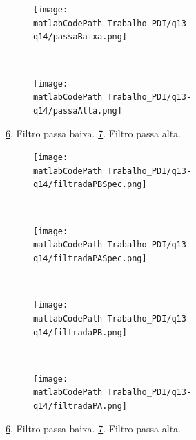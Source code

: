 \documentclass[
	article,			%
	11pt,				%
	oneside,			%
	a4paper,			%
	english,			%
	brazil,				%
	sumario=tradicional
	]{abntex2}
\newcommand{\matlabCodePath}{/home/clifte/git/Mestrado/Matlab/}
\begin{document}
\begin{figure}
		\centering
        \begin{subfigure}[b]{0.3\textwidth}
                \texttt{[image: \\matlabCodePath Trabalho\_PDI/q13-q14/passaBaixa.png]}
                \caption{}
                \label{fig:passaBaixa}
        \end{subfigure}%
        ~ %
        \begin{subfigure}[b]{0.3\textwidth}
                \texttt{[image: \\matlabCodePath Trabalho\_PDI/q13-q14/passaAlta.png]}
                \caption{}
                \label{fig:passaAlta}
        \end{subfigure}
       
        \caption{ 
        \ref{fig:passaBaixa}. Filtro passa baixa.
        \ref{fig:passaAlta}. Filtro passa alta. 
        }
	\label{fig:filtrosFrequencia}
\end{figure}

\begin{figure}
		\centering
        \begin{subfigure}[b]{0.3\textwidth} 
                \texttt{[image: \\matlabCodePath Trabalho\_PDI/q13-q14/filtradaPBSpec.png]}
                \caption{}
                \label{fig:passaBaixa}
        \end{subfigure}%
        ~ %
        \begin{subfigure}[b]{0.3\textwidth}
                \texttt{[image: \\matlabCodePath Trabalho\_PDI/q13-q14/filtradaPASpec.png]}
                \caption{}
                \label{fig:passaAlta}
        \end{subfigure}
 		~      
		\centering
        \begin{subfigure}[b]{0.3\textwidth}
                \texttt{[image: \\matlabCodePath Trabalho\_PDI/q13-q14/filtradaPB.png]}
                \caption{}
                \label{fig:passaBaixa} 
        \end{subfigure}%
        ~ %
        \begin{subfigure}[b]{0.3\textwidth}
                \texttt{[image: \\matlabCodePath Trabalho\_PDI/q13-q14/filtradaPA.png]}
                \caption{}
                \label{fig:passaAlta}
        \end{subfigure}      
      
        \caption{ 
        \ref{fig:passaBaixa}. Filtro passa baixa.
        \ref{fig:passaAlta}. Filtro passa alta.
        }
	\label{fig:filtrosFrequencia}
\end{figure}
\end{document}
